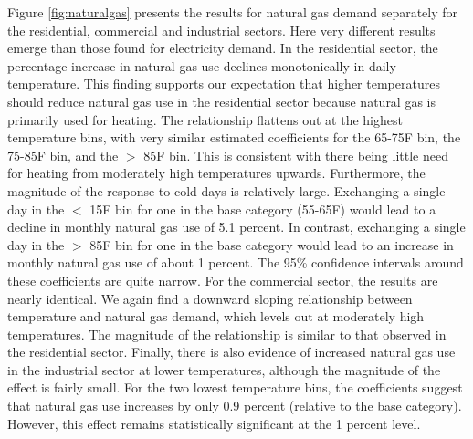 \documentclass[11pt]{article}
\begin{document}
Figure \ref{fig:naturalgas} presents the results for natural gas demand separately for the residential, commercial and industrial sectors. Here very different results emerge than those found for electricity demand. In the residential sector, the percentage increase in natural gas use declines monotonically in daily temperature. This finding supports our expectation that higher temperatures should reduce natural gas use in the residential sector because natural gas is primarily used for heating. The relationship flattens out at the highest temperature bins, with very similar estimated coefficients for the 65-75\degree F bin, the 75-85\degree F bin, and the $>$ 85\degree F bin. This is consistent with there being little need for heating from moderately high temperatures upwards. Furthermore, the magnitude of the response to cold days is relatively large. Exchanging a single day in the $<$ 15\degree F bin for one in the base category (55-65\degree F) would lead to a decline in monthly natural gas use of 5.1 percent. In contrast, exchanging a single day in the $>$ 85\degree F bin for one in the base category would lead to an increase in monthly natural gas use of about 1 percent. The 95\% confidence intervals around these coefficients are quite narrow. For the commercial sector, the results are nearly identical. We again find a downward sloping relationship between temperature and natural gas demand, which levels out at moderately high temperatures. The magnitude of the relationship is similar to that observed in the residential sector. Finally, there is also evidence of increased natural gas use in the industrial sector at lower temperatures, although the magnitude of the effect is fairly small. For the two lowest temperature bins, the coefficients suggest that natural gas use increases by only 0.9 percent (relative to the base category). However, this effect remains statistically significant at the 1 percent level. 
   
\end{document}

